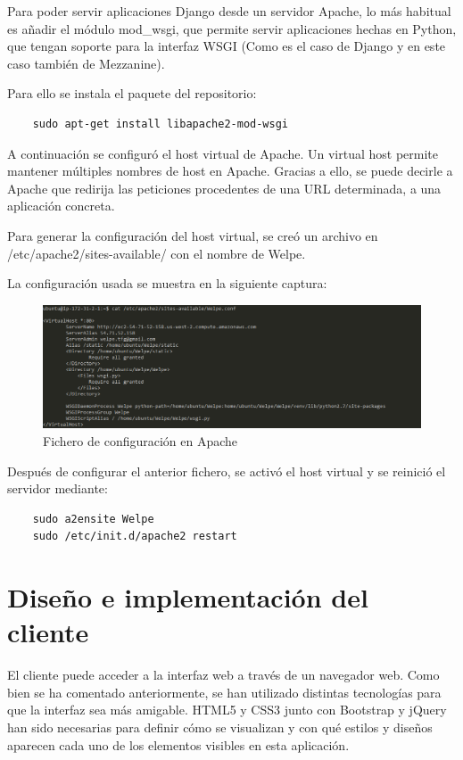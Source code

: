 Para poder servir aplicaciones Django desde un servidor Apache, lo más habitual es añadir el módulo mod\_wsgi, que permite servir aplicaciones hechas en Python, que tengan soporte para la interfaz WSGI (Como es el caso de Django y en este caso también de Mezzanine).


Para ello se instala el paquete del repositorio:
\begin{verbatim}
	sudo apt-get install libapache2-mod-wsgi
\end{verbatim}

A continuación se configuró el host virtual de Apache. Un virtual host permite mantener múltiples nombres de host en Apache. Gracias a ello, se puede decirle a Apache que redirija las peticiones procedentes de una URL determinada, a una aplicación concreta.

Para generar la configuración del host virtual, se creó un archivo en /etc/apache2/sites-available/ con el nombre de Welpe.

La configuración usada se muestra en la siguiente captura:

\begin{figure}[H]
   \centering
   \includegraphics[width=12cm]{img/welpe_conf}
   \caption{Fichero de configuración en Apache}
   \label{figura:welpe_conf}
\end{figure}

Después de configurar el anterior fichero, se activó el host virtual y se reinició el servidor mediante:
\begin{verbatim}
	sudo a2ensite Welpe
	sudo /etc/init.d/apache2 restart
\end{verbatim}


\section{Diseño e implementación del cliente} 
\label{sec:cliente}


El cliente puede acceder a la interfaz web a través de un navegador web. Como bien se ha comentado anteriormente, se han utilizado distintas tecnologías para que la interfaz sea más amigable. HTML5 y CSS3 junto con Bootstrap y jQuery han sido necesarias para definir cómo se visualizan y con qué estilos y diseños aparecen cada uno de los elementos visibles en esta aplicación. 


